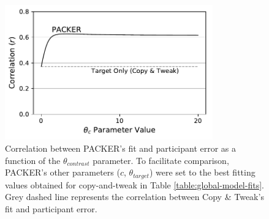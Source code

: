 \begin{figure}
    \begin{center}
    \includegraphics[width=0.8\textwidth]{figs/packer-corr.pdf}
    \caption{Correlation between PACKER's fit and participant error as a
function of the $\theta_{contrast}$ parameter. To facilitate comparison,
PACKER's other parameters ($c$, $\theta_{target}$) were set to the best fitting
values obtained for copy-and-tweak in Table \ref{table:global-model-fits}. Grey
dashed line represents the correlation between Copy \& Tweak's fit and
participant error.}
    \label{fig:packer-corr}
    \end{center}
\end{figure}













